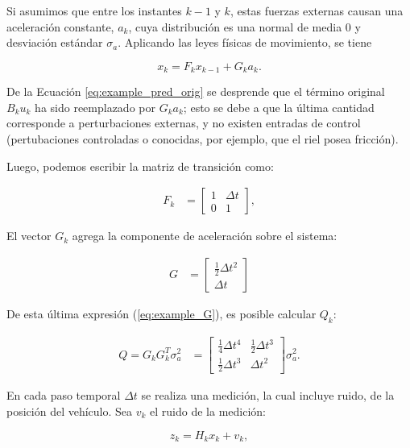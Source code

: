 Si asumimos que entre los instantes $k-1$ y $k$, estas fuerzas externas causan una aceleraci\'on constante, $a_k$, cuya distribuci\'on es una normal de media 0 y desviaci\'on est\'andar $\sigma_a$. Aplicando las leyes f\'isicas de movimiento, se tiene

\begin{equation}
x_{k} = F_k x_{k-1} + G_k a_k.
\label{eq:example_pred_orig} 
\end{equation}

De la Ecuaci\'on \ref{eq:example_pred_orig} se desprende que el t\'ermino original $B_k u_k$ ha sido reemplazado por $G_k a_k$; esto se debe a que la \'ultima cantidad corresponde a perturbaciones externas, y no existen entradas de control (pertubaciones controladas o conocidas, por ejemplo, que el riel posea fricci\'on).
\bigskip

Luego, podemos escribir la matriz de transici\'on como:

\begin{align}
F_k &= \begin{bmatrix}
1 & \Delta t\\
0 & 1 
\end{bmatrix},
\label{eq:example_F}
\end{align}
 
El vector $G_k$ agrega la componente de aceleraci\'on sobre el sistema:

\begin{align}
G &= \begin{bmatrix}
\frac{1}{2} \Delta t^2\\
\Delta t
\end{bmatrix}
\label{eq:example_G}
\end{align}

De esta \'ultima expresi\'on (\ref{eq:example_G}), es posible calcular $Q_k$: 

\begin{align}
Q = G_k G_k^T \sigma_a^2 &= \begin{bmatrix}
\frac{1}{4}\Delta t^4 & \frac{1}{2}\Delta t^3\\
 \frac{1}{2}\Delta t^3 & \Delta t^2
\end{bmatrix} \sigma_a^2. 
\end{align}

En cada paso temporal $\Delta t$ se realiza una medici\'on, la cual incluye ruido, de la posici\'on del veh\'iculo. Sea $v_k$ el ruido de la medici\'on:

\begin{equation}
z_k = H_k x_k + v_k,
\label{eq:corr_example}
\end{equation}

